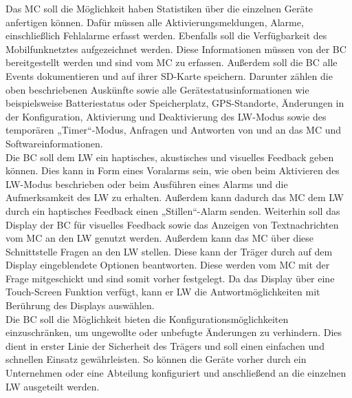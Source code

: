\documentclass[thesis.tex]{subfiles}
\begin{document}
Das MC soll die Möglichkeit haben Statistiken über die einzelnen Geräte anfertigen können.
Dafür müssen alle Aktivierungsmeldungen, Alarme, einschließlich Fehlalarme erfasst werden.
Ebenfalls soll die Verfügbarkeit des Mobilfunknetztes aufgezeichnet werden.
Diese Informationen müssen von der BC bereitgestellt werden und sind vom MC zu erfassen.
Außerdem soll die BC alle Events dokumentieren und auf ihrer SD-Karte speichern.
Darunter zählen die oben beschriebenen Auskünfte sowie alle Gerätestatusinformationen wie beispielsweise Batteriestatus
oder Speicherplatz, GPS-Standorte, Änderungen in der Konfiguration, Aktivierung und Deaktivierung des LW-Modus
sowie des temporären „Timer“-Modus, Anfragen und Antworten von und an das MC und Softwareinformationen.
\\

Die BC soll dem LW ein haptisches, akustisches und visuelles Feedback geben können.
Dies kann in Form eines Voralarms sein, wie oben beim Aktivieren des LW-Modus beschrieben oder beim Ausführen eines Alarms
und die Aufmerksamkeit des LW zu erhalten.
Außerdem kann dadurch das MC dem LW durch ein haptisches Feedback einen „Stillen“-Alarm senden.
Weiterhin soll das Display der BC für visuelles Feedback sowie das Anzeigen von Textnachrichten vom MC an den LW genutzt werden.
Außerdem kann das MC über diese Schnittstelle Fragen an den LW stellen.
Diese kann der Träger durch auf dem Display eingeblendete Optionen beantworten.
Diese werden vom MC mit der Frage mitgeschickt und sind somit vorher festgelegt.
Da das Display über eine Touch-Screen Funktion verfügt, kann er LW die Antwortmöglichkeiten mit Berührung des Displays auswählen.
\\

Die BC soll die Möglichkeit bieten die Konfigurationsmöglichkeiten einzuschränken, um ungewollte oder unbefugte Änderungen zu verhindern.
Dies dient in erster Linie der Sicherheit des Trägers und soll einen einfachen und schnellen Einsatz gewährleisten.
So können die Geräte vorher durch ein Unternehmen oder eine Abteilung konfiguriert und anschließend an die einzelnen LW ausgeteilt werden.
\\


\subfilebib %
\end{document}
